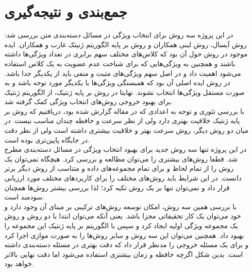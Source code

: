 \chapter{جمع‌بندی و نتیجه‌گیری}
در این پروژه سه روش برای انتخاب ویژگی در مسائل دسته‌بندی متن بررسی شد: روش  آیسال\cite{uysal2016improved}، روش  لبنی همکاران\cite{labani2018novel} و روش بر پایه الگوریتم ژنیتک غارب و همکاران\cite{ghareb2016hybrid}. ایده موجود در روش  حول آن بود که کلاس‌های مختلف سهم برابری در تعداد ویژگی‌ها داشته باشند و همچنین به ویژگی‌‌هایی که برای شناخت عدم عضویت به یک کلاس استفاده می‌شود اهمیت داد و در اصل سهم ویژگی‌های مثبت و منفی باید از یکدیگر جدا باشد. در روش  ایده اصلی آن بود که همبستگی ویژگی‌ها با یکدیگر مورد توجه باشد و به صورت مستقل ویژگی‌ها انتخاب نشوند. نهایتا در روش بر پایه ژنتیک، از الگوریتم ژنتیک برای بهبود خروجی روش‌های انتخاب ویژگی کمک گرفته شد.
\\

با بررسی تئوری و توجه به اعدادی که در مقاله گزارش شده بود، دریافتیم که روش بر پایه ژنتیک خلاقیت بهتری دارد ولی از نظر سرعت و حافظه چندان مناسب نیست. در میان دو روش دیگر، روش  سرعت بهتر و خلاقیت بیشتری داشته است ولی از نظر دقت در جایگاه پایین‌تری بوده است.
\\

در این پروژه تنها سه روش جدید برای بهبود انتخاب ویژگی در مسائل دسته‌بندی مطرح شد. قطعا روش‌های بیشتری را می‌توان مطالعه و بررسی کرد. هیچگاه نمی‌توان یک روش را از تمام لحاظ و برای تمام مجموعه‌های داده و متناسب از روش دیگر برتر دانست. در این شرایط باید روش‌های مختلف را برای کاربرد‌های مختلف مورد ارزیابی قرار داد و نمی‌توان تنها بر یک روش تکیه کرد؛ لذا بررسی بیشتر روش‌ها همچنان سودمند است.
\\

با بررسی همین سه روش، امکان توسعه روش‌های ترکیبی بر مبنای آن وجود دارد و خود می‌توان یک کار تحقیقاتی مجزا باشد. یعنی آنکه می‌توان ابتدا با دو روش  و روش  یک مجموعه ویژگی اولیه ایجاد کرد و سپس با الگوریتم بر پایه ژنتیک این مجموعه را بهبود داد. همچنین می‌توان این سه روش و سایر روش‌ها را به صورت موازی اجرا کرد و برای یک مسئله خروجی را مدنظر قرار داد که دقت بهتری در مسئله دسته‌بندی داشته است. بدین شکل اگرچه حافظه و زمان بیشتری استفاده می‌شود اما دقت نهایی بالاتر خواهد بود. 